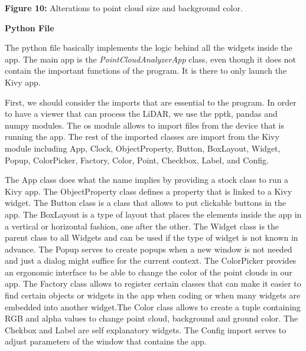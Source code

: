 \documentclass[12pt]{report}
\begin{document}
\vspace{\baselineskip}
\begin{Center}
\textbf{Figure 10: }Alterations to point cloud size and background color.
\end{Center}\par


\vspace{\baselineskip}

\vspace{\baselineskip}
\begin{FlushLeft}
\textbf{Python File}
\end{FlushLeft}\par

\tab 
\vspace{\baselineskip}\begin{FlushLeft}
\tab The python file basically implements the logic behind all the widgets inside the app. The main app is the \textit{PointCloudAnalyzerApp }class, even though it does not contain the important functions of the program. It is there to only launch the Kivy app.
\end{FlushLeft}\par


\vspace{\baselineskip}
\begin{FlushLeft}
\tab First, we should consider the imports that are essential to the program. In order to have a viewer that can process the LiDAR, we use the pptk, pandas and numpy modules. The os module allows to import files from the device that is running the app. The rest of the imported classes are import from the Kivy module including App, Clock, ObjectProperty, Button, BoxLayout, Widget, Popup, ColorPicker, Factory, Color, Point, Checkbox, Label, and Config.
\end{FlushLeft}\par


\vspace{\baselineskip}
\begin{FlushLeft}
The App class does what the name implies by providing a stock class to run a Kivy app. The ObjectProperty class defines a property that is linked to a Kivy widget. The Button class is a class that allows to put clickable buttons in the app. The BoxLayout is a type of layout that places the elements inside the app in a vertical or horizontal fashion, one after the other. The Widget class is the parent class to all Widgets and can be used if the type of widget is not known in advance. The Popup serves to create popups when a new window is not needed and just a dialog might suffice for the current context. The ColorPicker provides an ergonomic interface to be able to change the color of the point clouds in our app. The Factory class allows to register certain classes that can make it easier to find certain objects or widgets in the app when coding or when many widgets are embedded into another widget.The Color class allows to create a tuple containing RGB and alpha values to change point cloud, background and ground color. The Chekbox and Label are self explanatory widgets. The Config import serves to adjust parameters of the window that contains the app.
\end{FlushLeft}\par
\end{document}
